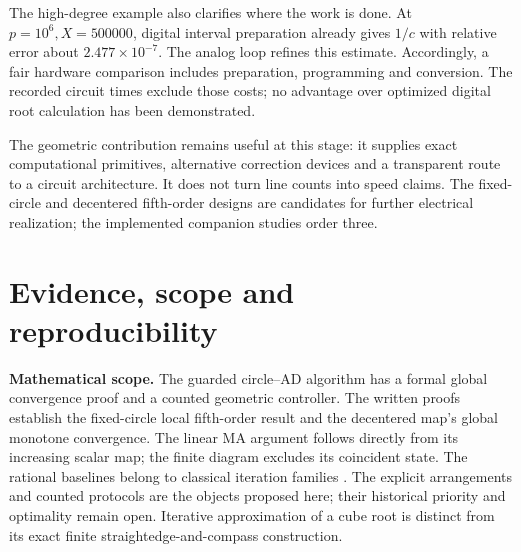 \documentclass[11pt,a4paper]{article}
\begin{document}
The high-degree example also clarifies where the work is done. At $p=10^6,X=500000$, digital interval preparation already gives $1/c$ with relative error about $2.477\times10^{-7}$. The analog loop refines this estimate. Accordingly, a fair hardware comparison includes preparation, programming and conversion. The recorded circuit times exclude those costs; no advantage over optimized digital root calculation has been demonstrated.

The geometric contribution remains useful at this stage: it supplies exact computational primitives, alternative correction devices and a transparent route to a circuit architecture. It does not turn line counts into speed claims. The fixed-circle and decentered fifth-order designs are candidates for further electrical realization; the implemented companion studies order three.

\section{Evidence, scope and reproducibility}\label{sec:scope}
\textbf{Mathematical scope.} The guarded circle--AD algorithm has a formal global convergence proof and a counted geometric controller. The written proofs establish the fixed-circle local fifth-order result and the decentered map's global monotone convergence. The linear MA argument follows directly from its increasing scalar map; the finite diagram excludes its coincident state. The rational baselines belong to classical iteration families \cite{dlmf38,laszkiewicz2009,baker1996}. The explicit arrangements and counted protocols are the objects proposed here; their historical priority and optimality remain open. Iterative approximation of a cube root is distinct from its exact finite straightedge-and-compass construction.
\end{document}
